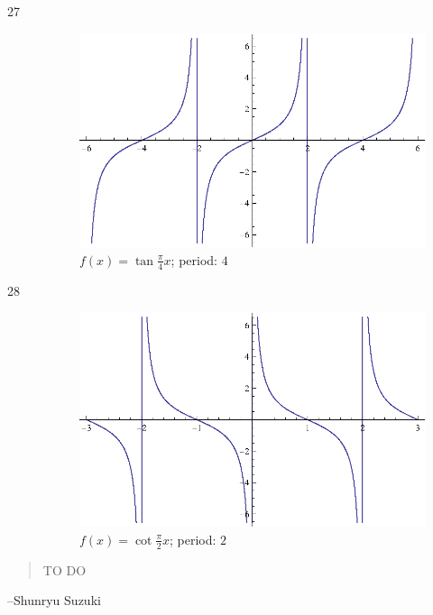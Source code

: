 \documentclass{exam}
\begin{document}
\begin{description}
      \item[27]
        \begin{figure}[H]
          \centering
          \includegraphics[scale=0.9]{exercise27.eps}
          \caption{$f(x) = \tan \frac{\pi}{4} x $; period: $4$}
        \end{figure}

      \item[28]
        \begin{figure}[H]
          \centering
          \includegraphics[scale=0.9]{exercise28.eps}
          \caption{$f(x) = \cot \frac{\pi}{2} x $; period: $2$}
        \end{figure}


    \end{description}
  \else
    \vspace{1 cm}
    \begin{quote}
      \begin{em}
        TO DO
      \end{em}
    \end{quote}
    \hspace{1 cm} --Shunryu Suzuki
  \fi
\end{document}
